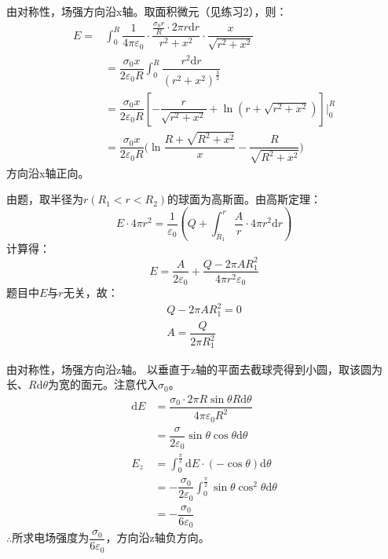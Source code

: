\documentclass[b5paper,opensource]{./template/qyxf-book}
\newcommand{\di}[1]{\mathrm{d}#1}
\begin{document}

\solve
由对称性，场强方向沿x轴。取面积微元（见练习2），则：
\begin{align*}
	E=&\int_0^R\dfrac{1}{4\pi\varepsilon_0}\cdot\dfrac{\frac{\sigma_0r}{R}\cdot 2\pi r\di{r}}{r^2+x^2}\cdot\dfrac{x}{\sqrt{r^2+x^2}}\\
	&=\dfrac{\sigma_0x}{2\varepsilon_0R}\int_0^R\dfrac{r^2\di{r}}{{(r^2+x^2)}^\frac{3}{2}}\\
	&=\dfrac{\sigma_0x}{2\varepsilon_0R}[-\dfrac{r}{\sqrt{r^2+x^2}}+\ln(r+\sqrt{r^2+x^2})]\Big|_0^R\\
	&=\dfrac{\sigma_0x}{2\varepsilon_0R}\big(\ln\dfrac{R+\sqrt{R^2+x^2}}{x}-\dfrac{R}{\sqrt{R^2+x^2}}\big)
\end{align*}
方向沿x轴正向。


\solve
由题，取半径为$r(R_1<r<R_2)$的球面为高斯面。由高斯定理：
\begin{equation*}
	E\cdot 4\pi r^2=\dfrac{1}{\varepsilon_0}(Q+\int_{R_1}^r\dfrac{A}{r}\cdot 4\pi r^2\di{r})
\end{equation*}
计算得：
\begin{equation*}
	E=\dfrac{A}{2\varepsilon_0}+\dfrac{Q-2\pi AR_1^2}{4\pi r^2\varepsilon_0}
\end{equation*}
题目中$E$与$r$无关，故：
\begin{gather*}
	Q-2\pi AR_1^2=0\\
	A=\dfrac{Q}{2\pi R_1^2}
\end{gather*}


\solve
由对称性，场强方向沿z轴。
以垂直于z轴的平面去截球壳得到小圆，取该圆为长、$R\di{\theta}$为宽的面元。注意代入$\sigma_0$。
\begin{align*}
	\di{E}&=\dfrac{\sigma_0\cdot 2\pi R\sin \theta R\di{\theta}}{4\pi \varepsilon_0 R^2}\\
	&=\dfrac{\sigma}{2\varepsilon_0}\sin\theta\cos\theta\di{\theta}\\
	E_z&=\int_0^{\frac{\pi}{2}}\di{E}\cdot(-\cos\theta)\di{\theta}\\
	&=-\dfrac{\sigma_0}{2\varepsilon_0}\int_0^{\frac{\pi}{2}}\sin\theta\cos^2\theta\di{\theta}\\
	&=-\dfrac{\sigma_0}{6\varepsilon_0}
\end{align*}
$\therefore$所求电场强度为$\dfrac{\sigma_0}{6\varepsilon_0}$，方向沿z轴负方向。
\end{document}
